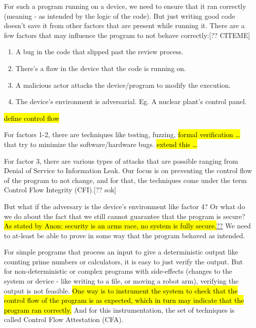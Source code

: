 \documentclass[a4paper, nobind]{templates/ociamthesis}
\providecommand{\tightlist}{%
  \setlength{\itemsep}{0pt}\setlength{\parskip}{0pt}}
\begin{document}
For such a program running on a device, we need to ensure that it ran correctly
(meaning - as intended by the logic of the code).
But just writing good code doesn't save it from other factors that are present while running it.
There are a few factors that may influence the program to not behave correctly:{[}?? CITEME{]}

\begin{enumerate}
\def\labelenumi{\arabic{enumi}.}
\tightlist
\item
  A bug in the code that slipped past the review process.
\item
  There's a flaw in the device that the code is running on.
\item
  A malicious actor attacks the device/program to modify the execution.
\item
  The device's environment is adversarial. Eg. A nuclear plant's control panel.
\end{enumerate}

\hl{define control flow}

For factors 1-2, there are techniques like testing, fuzzing, \hl{formal verification \ldots{}}
that try to minimize the software/hardware bugs. \hl{extend this \ldots{}}

For factor 3, there are various types of attacks that are possible ranging from
Denial of Service to Information Leak.
Our focus is on preventing the control flow of the program to not change,
and for that, the techniques come under the term Control Flow Integrity (CFI).{[}?? sok{]}

But what if the adversary is the device's environment like factor 4?
Or what do we do about the fact that we still cannot guarantee that the program is secure?
\hl{As stated by Anon: security is an arms race, no system is fully secure.}\href{}{??}
We need to at-least be able to prove in some way that the program behaved as intended.

For simple programs that process an input to give a deterministic output like
counting prime numbers or calculators, it is easy to just verify the output.
But for non-deterministic or complex programs with side-effects (changes to the
system or device - like writing to a file, or moving a robot arm), verifying the
output is not feasible. \hl{One way is to instrument the system to check that the
control flow of the program is as expected, which in turn may indicate
that the program ran correctly.}
And for this instrumentation, the set of techniques is called Control Flow
Attestation (CFA).
\end{document}
